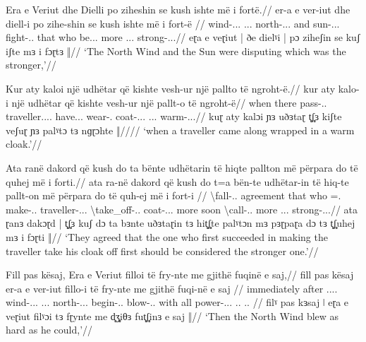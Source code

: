 \documentclass[a4paper,12pt]{article}
\newcommand{\gipa}{ɡ}
\begin{document}
\ex
\begingl
\glpreamble Era e Veriut dhe Dielli po ziheshin se kush ishte më i fortë.//
\gla er-a e ver-iut {} dhe diell-i {} po zihe-shin se kush ishte më i fort-ë {}//
\glgloss wind-{\F.\Sg.\Nom.\Def} {\F.\Sg.\Gen.\Def} north-{\M.\Sg.\Gen.\Def} {} and sun-{\M.\Sg.\Nom.\Def} {} {\Prog} fight-{\Impf.\Ind.\Tpl} that who be.{\Impf.\Ind.\Tsg} more {\M.\Sg.\Acc.\Def} strong-{\M.\Sg.\Acc.\Def}//
\glpm eɽa e veɽiut | ðe dielˠi | pɔ ziheʃin se kuʃ iʃte mɜ i fɔɽtɜ ‖//
\glft `The North Wind and the Sun were disputing which was the stronger,'//
\endgl
\xe

\ex
\begingl
\glpreamble Kur aty kaloi një udhëtar që kishte vesh-ur një pallto të ngroht-ë.//
\gla kur aty kalo-i një udhëtar që kishte vesh-ur një pallt-o të ngroht-ë//
\glgloss when there pass-{\Aor.\Ind.\Tsg} {\Indf} traveller.{\M.\Sg.\Nom.\Indf} {\Rprn} have.{\Pst.\Pfct.\Ind} wear-{\Pst.\Ptcp} {\Indf} coat-{\F.\Sg.\Acc.\Indf} {\F.\Sg.\Acc.\Indf} warm-{\F.\Sg.\Acc.\Indf}//
\glpm kuɽ aty kalɔi ɲɜ uðɜtaɽ t̻ʃ̻ɜ kiʃte veʃuɽ ɲɜ palˠtɔ tɜ n\gipa{}ɽɔhte ‖////
\glft `when a traveller came along wrapped in a warm cloak.'//
\endgl
\xe

\ex
\begingl
\glpreamble Ata ranë dakord që kush do ta bënte udhëtarin të hiqte pallton më përpara do të quhej më i forti.//
\gla ata ra-në dakord {} që kush do t=a bën-te udhëtar-in të hiq-te pallt-on më përpara do të quh-ej më i fort-i {}//
 \Aor\textbackslash{}fall-{\Aor.\Ind.\Tpl} agreement {} that who {\Fut} {\Fut=\Tsg.\Acc} make-{\Ind.\Impf.\Tsg} traveller-{\M.\Sg.\Acc.\Def} {\Sbjv} \Sbjv\textbackslash{}take\_off-{\Pst.\Sbjv.\Tsg} coat-{\F.\Sg.\Acc.\Def} more soon {\Fut} {\Fut} \Pass\textbackslash{}call-{\Impf.\Ind.\Tsg} more {\M.\Sg.\Nom.\Def} strong-{\M.\Sg.\Nom.\Def}//
\glpm ata ɽanɜ dakɔɽd | t̻ʃ̻ɜ kuʃ dɔ ta bɜnte uðɜtaɽin tɜ hit̻ʃ̻te palˠtɔn mɜ pɜɽpaɽa dɔ tɜ t̻ʃ̻uhej mɜ i fɔɽti ‖//
\glft `They agreed that the one who first succeeded in making the traveller take his cloak off first should be considered the stronger one.'//
\endgl
\xe

\ex
\begingl
\glpreamble Fill pas kësaj, Era e Veriut filloi të fry-nte me gjithë fuqinë e saj,//
\gla fill pas kësaj {} er-a e ver-iut fillo-i të fry-nte me gjithë fuqi-në e saj {}//
\glgloss immediately after {\Dem.\F.\Sg.\Abl.\Def} {} wind-{\Nom.\F.\Sg.\Def} {\M.\Sg.\Gen.\Def} north-{\M.\Sg.\Gen.\Def} begin-{\Aor.\Ind.\Tsg} {\Sbjv} blow-{\Impf.\Sbjv.\Tsg} with all power-{\F.\Sg.\Acc.\Def} {\Tsg.\F.\Gen} {\Tsg.\F.\Poss} {}//
\glpm filˠ pas kɜsaj ǀ eɽa e veɽiut filˠɔi tɜ fɽynte me d̻ʒ̻iθɜ fut̻ʃ̻inɜ e saj ‖//
\glft `Then the North Wind blew as hard as he could,'//
\endgl
\xe
\end{document}
